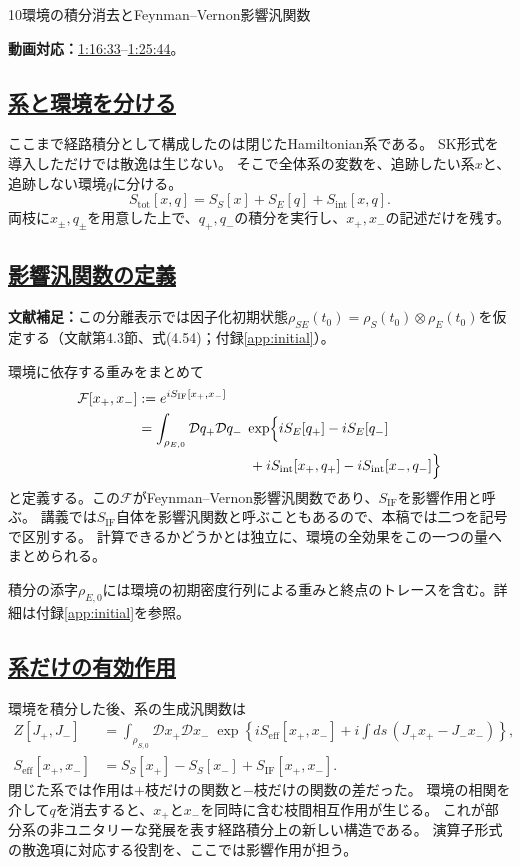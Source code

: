 \documentclass[a4paper,11pt]{ltjsarticle}
\newcommand{\subsectionlink}[1]{\subsection[#1]{\hyperlink{toc}{#1}}}
\numberwithin{equation}{section}
\newcommand{\IF}{\mathrm{IF}}
\newcommand{\video}[2]{\href{https://www.youtube.com/watch?v=RYxzcUhIHjk\&t=#1s}{#2}}
\newcommand{\videosource}[1]{\par\noindent\textcolor{noteblue}{\textbf{動画対応：}#1}\par\smallskip}
\newcommand{\supplement}[1]{\par\medskip\noindent\textcolor{notered}{\textbf{文献補足：}}#1\par\smallskip}
\begin{document}
\begin{lecturesection}{10}{環境の積分消去とFeynman--Vernon影響汎関数}
\label{sec:influence}
\videosource{\video{4593}{1:16:33}--\video{5144}{1:25:44}。}
\subsectionlink{系と環境を分ける}
ここまで経路積分として構成したのは閉じたHamiltonian系である。
SK形式を導入しただけでは散逸は生じない。
そこで全体系の変数を、追跡したい系$x$と、追跡しない環境$q$に分ける。
\begin{equation}
 S_{\mathrm{tot}}[x,q]=S_S[x]+S_E[q]+S_{\mathrm{int}}[x,q].
\end{equation}
両枝に$x_\pm,q_\pm$を用意した上で、$q_+,q_-$の積分を実行し、$x_+,x_-$の記述だけを残す。

\subsectionlink{影響汎関数の定義}
\supplement{この分離表示では因子化初期状態$\rho_{SE}(t_0)=\rho_S(t_0)\otimes\rho_E(t_0)$を仮定する（文献\cite{Pajer:2026fuo}第4.3節、式(4.54)；付録\ref{app:initial}）。}
環境に依存する重みをまとめて
\begin{align}
 \mathcal F[x_+,x_-]&:=e^{iS_{\IF}[x_+,x_-]}\notag\\
 &=\int_{\rho_{E,0}}\mathcal Dq_+\mathcal Dq_-\;
 \exp\Bigl\{iS_E[q_+]-iS_E[q_-]\notag\\
 &\hspace{8em}+iS_{\mathrm{int}}[x_+,q_+]
                   -iS_{\mathrm{int}}[x_-,q_-]\Bigr\}
 \label{eq:influence}
\end{align}
と定義する。この$\mathcal F$がFeynman--Vernon影響汎関数であり、$S_{\IF}$を影響作用と呼ぶ。
講義では$S_{\IF}$自体を影響汎関数と呼ぶこともあるので、本稿では二つを記号で区別する。
計算できるかどうかとは独立に、環境の全効果をこの一つの量へまとめられる。

積分の添字$\rho_{E,0}$には環境の初期密度行列による重みと終点のトレースを含む。詳細は付録\ref{app:initial}を参照。

\subsectionlink{系だけの有効作用}
環境を積分した後、系の生成汎関数は
\begin{align}
 Z[J_+,J_-]
 &=\int_{\rho_{S,0}}\mathcal D x_+\mathcal D x_-\;
 \exp\left\{iS_{\mathrm{eff}}[x_+,x_-]
 +i\int ds\,(J_+x_+-J_-x_-)\right\},\\
 S_{\mathrm{eff}}[x_+,x_-]
 &=S_S[x_+]-S_S[x_-]+S_{\IF}[x_+,x_-].
 \label{eq:seff}
\end{align}
閉じた系では作用は$+$枝だけの関数と$-$枝だけの関数の差だった。
環境の相関を介して$q$を消去すると、$x_+$と$x_-$を同時に含む枝間相互作用が生じる。
これが部分系の非ユニタリーな発展を表す経路積分上の新しい構造である。
演算子形式の散逸項に対応する役割を、ここでは影響作用が担う。


\end{lecturesection}
\end{document}
